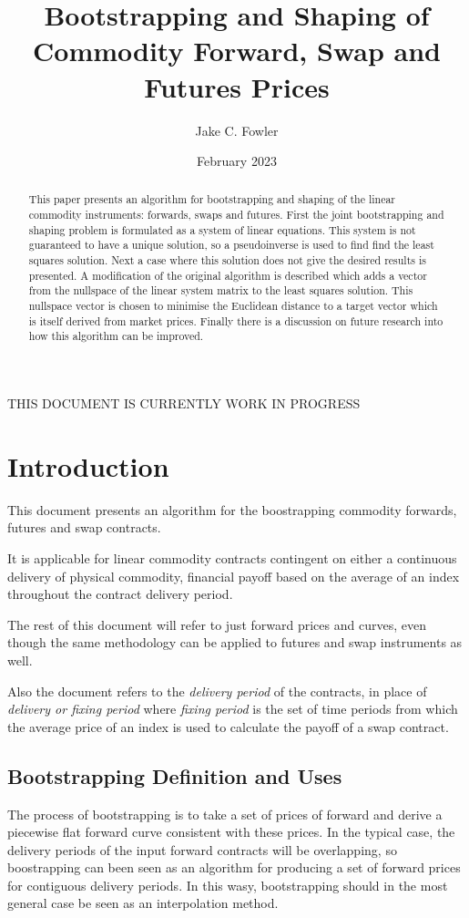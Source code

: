 \documentclass{article}
\title{Bootstrapping and Shaping of Commodity Forward, Swap and Futures Prices}
\author{Jake C. Fowler}
\date{February 2023}
\begin{document}
\newcommand{\+}[1]{\ensuremath{\mathbf{#1}}}

\maketitle

THIS DOCUMENT IS CURRENTLY WORK IN PROGRESS


\begin{abstract}
    This paper presents an algorithm for bootstrapping and shaping of the linear commodity
    instruments: forwards, swaps and futures. First the joint bootstrapping and shaping
    problem is formulated as a system of linear equations. This system is not guaranteed to have
    a unique solution, so a pseudoinverse is used to find
    find the least squares solution. Next a case where this solution does not give
    the desired results is presented. A modification of the original algorithm is
    described which adds a vector from the nullspace of the linear system matrix to
    the least squares solution. This nullspace vector is chosen to minimise the 
    Euclidean distance to a target vector which is itself derived from market prices.
    Finally there is a discussion on future research into how this algorithm can be 
    improved.
\end{abstract}


\section{Introduction}
This document presents an algorithm for the boostrapping commodity forwards, futures and swap 
contracts. 


It is applicable for linear commodity contracts contingent on either a continuous delivery
of physical commodity, financial payoff based on the average of an index throughout the
contract delivery period. 

The rest of this document will refer to just forward prices and curves, even though the same 
methodology can be applied to futures and swap instruments as well.

Also the document refers to the \emph{delivery period} of the contracts, in place of 
\emph{delivery or fixing period} where \emph{fixing period} is the set of time periods from 
which the average price of an index is used to calculate the payoff of a swap contract.

\subsection{Bootstrapping Definition and Uses}
The process of bootstrapping is to take a set of prices of forward and derive a piecewise 
flat forward curve consistent with these prices. In the typical case, the delivery periods 
of the input forward contracts will be overlapping, so boostrapping can been seen as an
algorithm for producing a set of forward prices for contiguous delivery periods. 
In this wasy, bootstrapping should in the most general case be seen as an interpolation method.
\end{document}
